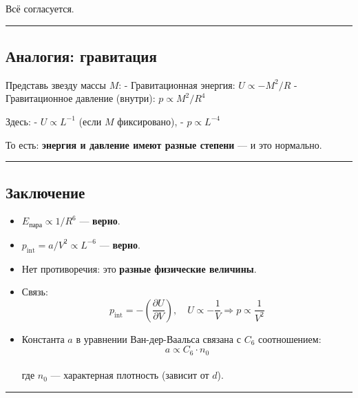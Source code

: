 \documentclass[11pt]{article}
\providecommand{\tightlist}{%
      \setlength{\itemsep}{0pt}\setlength{\parskip}{0pt}}
\begin{document}
Всё согласуется.

\begin{center}\rule{0.5\linewidth}{\linethickness}\end{center}

\subsection{Аналогия:
гравитация}\label{ux430ux43dux430ux43bux43eux433ux438ux44f-ux433ux440ux430ux432ux438ux442ux430ux446ux438ux44f}

Представь звезду массы \(M\): - Гравитационная энергия:
\(U \propto -M^2 / R\) - Гравитационное давление (внутри):
\(p \propto M^2 / R^4\)

Здесь: - \(U \propto L^{-1}\) (если \(M\) фиксировано), -
\(p \propto L^{-4}\)

То есть: \textbf{энергия и давление имеют разные степени} --- и это
нормально.

\begin{center}\rule{0.5\linewidth}{\linethickness}\end{center}

\subsection{Заключение}\label{ux437ux430ux43aux43bux44eux447ux435ux43dux438ux435-5}

\begin{itemize}
\tightlist
\item
  \(E_{\text{пара}} \propto 1/R^6\) --- \textbf{верно}.
\item
  \(p_{\text{int}} = a/V^2 \propto L^{-6}\) --- \textbf{верно}.
\item
  Нет противоречия: это \textbf{разные физические величины}.
\item
  Связь:\\
  \[
    p_{\text{int}} = -\left( \frac{\partial U}{\partial V} \right), \quad U \propto -\frac{1}{V} \Rightarrow p \propto \frac{1}{V^2}
    \]
\item
  Константа \(a\) в уравнении Ван-дер-Ваальса связана с \(C_6\)
  соотношением:\\
  \[
    a \propto C_6 \cdot n_0
    \]\\
  где \(n_0\) --- характерная плотность (зависит от \(d\)).
\end{itemize}

\begin{center}\rule{0.5\linewidth}{\linethickness}\end{center}
\end{document}
